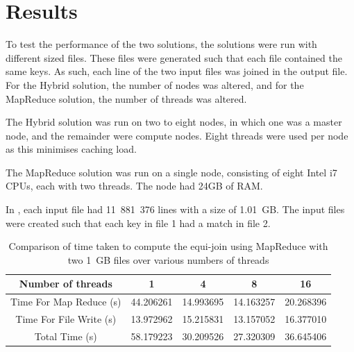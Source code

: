 \documentclass[11pt,twocolumn]{witseiepaper}
\begin{document}
%
%

\section{Results}
To test the performance of the two solutions, the solutions were run with different sized files. These files were generated such that each file contained the same keys. As such, each line of the two input files was joined in the output file. For the Hybrid solution, the number of nodes was altered, and for the MapReduce solution, the number of threads was altered.

The Hybrid solution was run on two to eight nodes, in which one was a master node, and the remainder were compute nodes. Eight threads were used per node as this minimises caching load.

The MapReduce solution was run on a single node, consisting of eight Intel i7 CPUs, each with two threads. The node had 24GB of RAM.

In , each input file had 11~881~376 lines with a size of 1.01~GB. The input files were created such that each key in file 1 had a match in file 2.

\begin{table} [t]
	\centering
	\caption{Comparison of time taken to compute the equi-join using MapReduce with two 1~GB files over various numbers of threads}
	\label{tab:results2}
	
	\begin{tabular}{|c|c|c|c|c|}
		\hline 
		Number of threads & 1 & 4 & 8 &16\\ 
		\hline
		\hline
		Time For Map Reduce (s) & 44.206261 & 14.993695 & 14.163257 &20.268396\\ 
		\hline 
		Time For File Write (s) & 13.972962 & 15.215831 & 13.157052 &16.377010\\ 
		\hline 
		Total Time (s) & 58.179223 & 30.209526 & 27.320309 &  36.645406\\ 
		\hline 
	\end{tabular} 
\end{table}
\end{document}
